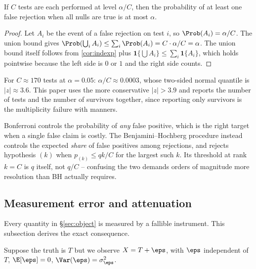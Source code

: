 \begin{theorem}[Bonferroni]
\label{thm:bonf}
If $C$ tests are each performed at level $\alpha/C$, then the probability of at
least one false rejection when all nulls are true is at most $\alpha$.
\end{theorem}
\begin{proof}
Let $A_i$ be the event of a false rejection on test $i$, so
$\Prob(A_i)=\alpha/C$. The union bound gives
$\Prob(\bigcup_i A_i) \le \sum_i \Prob(A_i) = C\cdot\alpha/C = \alpha$. The union
bound itself follows from \cref{cor:indexp} plus
$\mathbf{1}\{\bigcup A_i\} \le \sum_i \mathbf{1}\{A_i\}$, which holds pointwise
because the left side is $0$ or $1$ and the right side counts.
\end{proof}

\begin{corollary}
For $C \approx 170$ tests at $\alpha = 0.05$: $\alpha/C \approx 0.0003$, whose
two-sided normal quantile is $|z| \approx 3.6$. This paper uses the more
conservative $|z| > 3.9$ and reports the number of tests and the number of
survivors together, since reporting only survivors is the multiplicity failure
with manners.
\end{corollary}

\begin{remark}
Bonferroni controls the probability of \emph{any} false positive, which is the
right target when a single false claim is costly. The
Benjamini--Hochberg procedure instead controls the expected \emph{share} of false
positives among rejections, and rejects hypothesis $(k)$ when
$p_{(k)} \le qk/C$ for the largest such $k$. Its threshold at rank $k=C$ is $q$
itself, not $q/C$ -- confusing the two demands orders of magnitude more
resolution than BH actually requires.
\end{remark}

\subsection{Measurement error and attenuation}
\label{sec:atten}

Every quantity in §\ref{sec:object} is measured by a fallible instrument. This
subsection derives the exact consequence.

 Suppose the truth is $T$ but we observe
$X = T + \eps$, with $\eps$ independent of $T$, $\E[\eps]=0$,
$\Var(\eps)=\sigma_\eps^2$.

